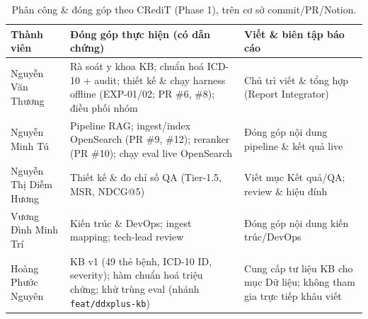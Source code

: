 \begin{appendices}
  \begin{table}[H]
    \centering
    \small
    \caption{Phân công \& đóng góp theo CRediT (Phase 1), trên cơ sở commit/PR/Notion.}
    \label{tab:credit}
    \begin{tabular}{p{2.8cm}p{4.8cm}p{3.4cm}}
      \hline
      \textbf{Thành viên}   & \textbf{Đóng góp thực hiện (có dẫn chứng)}                                                                             & \textbf{Viết \& biên tập báo cáo}                                       \\
      \hline
      Nguyễn Văn Thương     & Rà soát y khoa KB; chuẩn hoá ICD-10 + audit; thiết kế \& chạy harness offline (EXP-01/02; PR \#6, \#8); điều phối nhóm & Chủ trì viết \& tổng hợp (Report Integrator)                            \\
      Nguyễn Minh Tú        & Pipeline RAG; ingest/index OpenSearch (PR \#9, \#12); reranker (PR \#10); chạy eval live OpenSearch                    & Đóng góp nội dung pipeline \& kết quả live                              \\
      Nguyễn Thị Diễm Hương & Thiết kế \& đo chỉ số QA (Tier-1.5, MSR, NDCG@5)                                                                       & Viết mục Kết quả/QA; review \& hiệu đính                                \\
      Vương Đình Minh Trí   & Kiến trúc \& DevOps; ingest mapping; tech-lead review                                                                  & Đóng góp nội dung kiến trúc/DevOps                                      \\
      Hoàng Phước Nguyên    & KB v1 (49 thẻ bệnh, ICD-10 ID, severity); hàm chuẩn hoá triệu chứng; khử trùng eval (nhánh \texttt{feat/ddxplus-kb})   & Cung cấp tư liệu KB cho mục Dữ liệu; không tham gia trực tiếp khâu viết \\
      \hline
    \end{tabular}
  \end{table}

\end{appendices}


